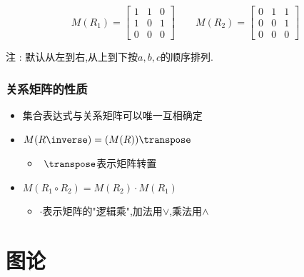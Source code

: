 {{{{    $$
      M(R_1) = \begin{bmatrix}
        1 & 1 & 0 \\
        1 & 0 & 1 \\
        0 & 0 & 0
      \end{bmatrix}
      \qquad
      M(R_2) = \begin{bmatrix}
        0 & 1 & 1 \\
        0 & 0 & 1 \\
        0 & 0 & 0
      \end{bmatrix}
    $$

    注 : 默认从左到右,从上到下按$a,b,c$的顺序排列.
  }%

  \subsubsection{关系矩阵的性质}{
    \begin{itemize}
      \item 集合表达式与关系矩阵可以唯一互相确定
      \item $M(R\inverse) = (M(R))\transpose$\begin{itemize}
              \item $~\transpose$表示矩阵转置
            \end{itemize}
      \item $M(R_1 \circ R_2) = M(R_2) \cdot M(R_1)$\begin{itemize}
              \item $\cdot$表示矩阵的"逻辑乘",加法用$\vee$,乘法用$\wedge$
            \end{itemize}
    \end{itemize}
  }%

}%

}%

\section{图论}{

}}
